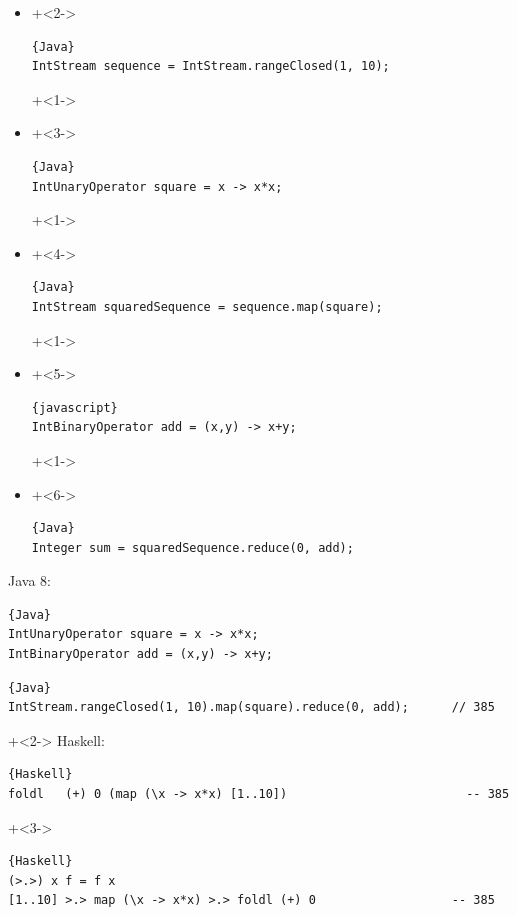 \begin{frame}[fragile]{}
\begin{itemize}
\item {}
\onslide+<2->
\begin{lstlisting}{Java}
IntStream sequence = IntStream.rangeClosed(1, 10);
\end{lstlisting}
\onslide+<1->
\item {}
\onslide+<3->
\begin{lstlisting}{Java}
IntUnaryOperator square = x -> x*x;
\end{lstlisting}
\onslide+<1->
\item {}
\onslide+<4->
\begin{lstlisting}{Java}
IntStream squaredSequence = sequence.map(square);
\end{lstlisting}
\onslide+<1->
\item {}
\onslide+<5->
\begin{lstlisting}{javascript}
IntBinaryOperator add = (x,y) -> x+y;
\end{lstlisting}
\onslide+<1->
\item {}
\onslide+<6->
\begin{lstlisting}{Java}
Integer sum = squaredSequence.reduce(0, add);
\end{lstlisting}
\end{itemize}

\end{frame}

\begin{frame}[fragile]{}
Java 8:
\begin{lstlisting}{Java}
IntUnaryOperator square = x -> x*x;
IntBinaryOperator add = (x,y) -> x+y;
\end{lstlisting}

\begin{lstlisting}{Java}
IntStream.rangeClosed(1, 10).map(square).reduce(0, add);      // 385
\end{lstlisting}

\onslide+<2->
Haskell:
\begin{lstlisting}{Haskell}
foldl	(+) 0 (map (\x -> x*x) [1..10])                         -- 385
\end{lstlisting}
\onslide+<3->
\begin{lstlisting}{Haskell}
(>.>) x f = f x
[1..10] >.> map (\x -> x*x) >.> foldl (+) 0                   -- 385
\end{lstlisting}

\end{frame}

